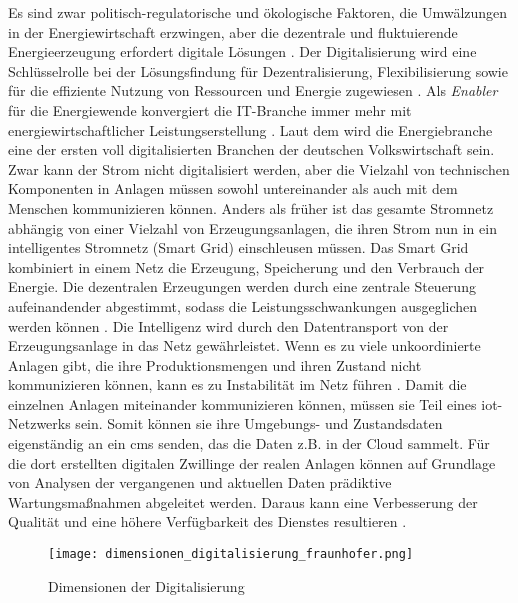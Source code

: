 \noindent Es sind zwar politisch-regulatorische und ökologische Faktoren, die Umwälzungen in der Energiewirtschaft erzwingen, aber die dezentrale und fluktuierende Energieerzeugung erfordert digitale Lösungen \citep{Doleski2017}. Der Digitalisierung wird eine Schlüsselrolle bei der Lösungsfindung für Dezentralisierung, Flexibilisierung sowie für die effiziente Nutzung von Ressourcen und Energie zugewiesen \citep{FraunhoferISE}. Als \textit{Enabler} für die Energiewende konvergiert die IT-Branche immer mehr mit energiewirtschaftlicher Leistungserstellung \citep{Doleski2015}. Laut dem \citet{BWE2015} wird die Energiebranche eine der ersten voll digitalisierten Branchen der deutschen Volkswirtschaft sein. Zwar kann der Strom nicht digitalisiert werden, aber die Vielzahl von technischen Komponenten in Anlagen müssen sowohl untereinander als auch mit dem Menschen kommunizieren können. Anders als früher ist das gesamte Stromnetz abhängig von einer Vielzahl von Erzeugungsanlagen, die ihren Strom nun in ein intelligentes Stromnetz (Smart Grid) einschleusen müssen. Das Smart Grid kombiniert in einem Netz die Erzeugung, Speicherung und den Verbrauch der Energie. Die dezentralen Erzeugungen werden durch eine zentrale Steuerung aufeinandender abgestimmt, sodass die Leistungsschwankungen ausgeglichen werden können \citep{Krone2017}. Die Intelligenz wird durch den Datentransport von der Erzeugungsanlage in das Netz gewährleistet. Wenn es zu viele unkoordinierte Anlagen gibt, die ihre Produktionsmengen und ihren Zustand nicht kommunizieren können, kann es zu Instabilität im Netz führen \citep{Umweltbundesamt2018}. Damit die einzelnen Anlagen miteinander kommunizieren können, müssen sie Teil eines \ac{iot}-Netzwerks sein. Somit können sie ihre Umgebungs- und Zustandsdaten eigenständig an ein \acf{cms} senden, das die Daten z.B. in der Cloud sammelt. Für die dort erstellten digitalen Zwillinge der realen Anlagen können auf Grundlage von Analysen der vergangenen und aktuellen Daten prädiktive Wartungsmaßnahmen abgeleitet werden. Daraus kann eine Verbesserung der Qualität und eine höhere Verfügbarkeit des Dienstes resultieren \citep{Utecht2018}.

\begin{figure}[h]
  \texttt{[image: dimensionen\_digitalisierung\_fraunhofer.png]}
  \caption[Dimensionen der Digitalisierung]{Dimensionen der Digitalisierung \citep{FraunhoferISE}}
  \label{dimensionen}
\end{figure}

